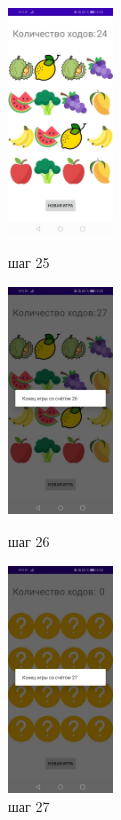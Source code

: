 \documentclass[12pt, a4paper, simple]{eskdtext}
\begin{document}
    \begin{figure}[!h]
        \centering
        \begin{minipage}{0.15\textwidth}
            \centering
            \includegraphics[height=6cm]
                {_assets/step_25.jpg}
            \caption{шаг 25}
            \label{fig:step_25}
        \end{minipage}
        \begin{minipage}{0.15\textwidth}
            \centering
            \includegraphics[height=6cm]
                {_assets/step_26.jpg}
            \caption{шаг 26}
            \label{fig:step_26}
        \end{minipage}
        \begin{minipage}{0.15\textwidth}
            \centering
            \includegraphics[height=6cm]
                {_assets/step_27.jpg}
            \caption{шаг 27}
            \label{fig:step_27}
        \end{minipage}
    \end{figure}
\end{document}

